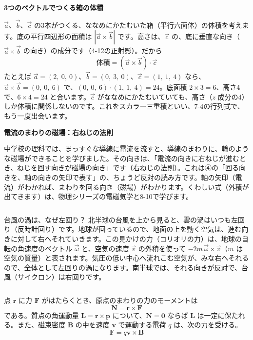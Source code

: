 \begin{motto}[5]
\textbf{3つのベクトルでつくる箱の体積}\par
$\vec a$、$\vec b$、$\vec c$ の3本がつくる、ななめにかたむいた箱（平行六面体）の体積を考えます。底の平行四辺形の面積は $|\vec a\times\vec b|$ です。高さは、$\vec c$ の、底に垂直な向き（$\vec a\times\vec b$ の向き）の成分です（4-12の正射影）。だから
\[ \text{体積}=(\vec a\times\vec b)\cdot\vec c \]
たとえば $\vec a=(2,\ 0,\ 0)$、$\vec b=(0,\ 3,\ 0)$、$\vec c=(1,\ 1,\ 4)$ なら、$\vec a\times\vec b=(0,\ 0,\ 6)$ で、$(0,\ 0,\ 6)\cdot(1,\ 1,\ 4)=24$。底面積 $2\times3=6$、高さ4で、$6\times4=24$ と合います。$\vec c$ がななめにかたむいていても、高さ（$z$ 成分の4）しか体積に関係しないのです。これをスカラー三重積といい、7-4の行列式で、もう一度出会います。
\end{motto}

\begin{motto}[3]
\textbf{電流のまわりの磁場：右ねじの法則}\par
中学校の理科では、まっすぐな導線に電流を流すと、導線のまわりに、輪のような磁場ができることを学びました。その向きは、「電流の向きに右ねじが進むとき、ねじを回す向きが磁場の向き」です（右ねじの法則）。これは④の「回る向きを、軸の向きの矢印で表す」の、ちょうど反対の読み方です。軸の矢印（電流）がわかれば、まわりを回る向き（磁場）がわかります。くわしい式（外積が出てきます）は、物理シリーズの電磁気学と8-10で学びます。
\end{motto}

\begin{column}{台風の渦は、なぜ左回り？}
北半球の台風を上から見ると、雲の渦はいつも左回り（反時計回り）です。地球が回っているので、地面の上を動く空気は、進む向きに対して右へそれていきます。この見かけの力（コリオリの力）は、地球の自転の角速度のベクトル $\vec\omega$ と、空気の速度 $\vec v$ の外積を使って $-2m\,\vec\omega\times\vec v$（$m$ は空気の質量）と表されます。気圧の低い中心へ流れこむ空気が、みな右へそれるので、全体として左回りの渦になります。南半球では、それる向きが反対で、台風（サイクロン）は右回りです。
\end{column}

\begin{senmonsho}[力学・電磁気学の書き方]
\begin{bkhonbun}
点 $\symbf r$ に力 $\symbf F$ がはたらくとき、原点のまわりの力のモーメントは
\[ \symbf N=\symbf r\times\symbf F \]
である。質点の角運動量 $\symbf L=\symbf r\times\symbf p$ について、$\symbf N=\symbf 0$ ならば $\symbf L$ は一定に保たれる。また、磁束密度 $\symbf B$ の中を速度 $\symbf v$ で運動する電荷 $q$ は、次の力を受ける。
\[ \symbf F=q\symbf v\times\symbf B \]
\end{bkhonbun}
\end{senmonsho}

